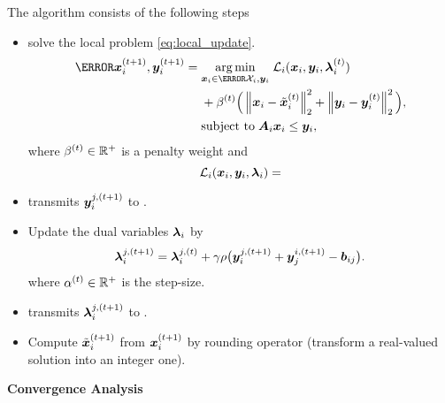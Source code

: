 \documentclass[twocolumn,amsthm]{autart}%
\theoremstyle{definition}
\theoremstyle{plain}
\begin{document}
The algorithm consists of the following steps
\begin{itemize}
\item {} solve the local problem \eqref{eq:local_update}.
\begin{equation}
\label{eq:local_update}
\begin{split}
\bar{\bbsym{x}}_i^{(t+1)}, {\bbsym{y}}_i^{(t+1)} =\; & \underset{\bbsym{x}_i \in \bar{\XXX}_i, \bbsym{y}_i}{\argmin}  \; \LLL_i (\bbsym{x}_i, \bbsym{y}_i, \bbsym{\lambda}_{i}^{(t)}) \\
& + \beta^{(t)} \Big( \norm{\bbsym{x}_i - \tilde{\bbsym{x}}_i^{(t)}}_2^2 + \norm{\bbsym{y}_i - \bbsym{y}_i^{(t)}}_2^2 \Big) , \\
& \text{subject to} \; \bbsym{A}_{i} \bbsym{x}_i \le \bbsym{y}_{i},
\end{split}
\end{equation}
where $\beta^{(t)} \in \mathbb{R}^{+}$ is a penalty weight and 
\begin{equation}
\mathcal{L}_i (\boldsymbol{x}_i, \boldsymbol{y}_i, \boldsymbol{\lambda}_{i}) =    
\end{equation}

\item {} transmits ${\boldsymbol{y}}_i^{j,(t+1)}$ to .
\item Update the dual variables $\boldsymbol{\lambda}_{i}$ by 
\begin{equation}
\boldsymbol{\lambda}_{i}^{j,(t+1)} = \boldsymbol{\lambda}_{i}^{j,(t)} + \gamma \rho \big( \boldsymbol{y}_{i}^{j,(t+1)} + \boldsymbol{y}_{j}^{i,(t+1)} - \boldsymbol{b}_{ij} \big).
\end{equation}
where $\alpha^{(t)} \in \mathbb{R}^{+}$ is the step-size.
\item {} transmits $\boldsymbol{\lambda}_i^{j,(t+1)}$ to .
\item Compute $\tilde{\boldsymbol{x}}_i^{(t+1)}$ from $\boldsymbol{x}_i^{(t+1)}$ by rounding operator (transform a real-valued solution into an integer one).
\end{itemize}



\textbf{Convergence Analysis}
\end{document}

